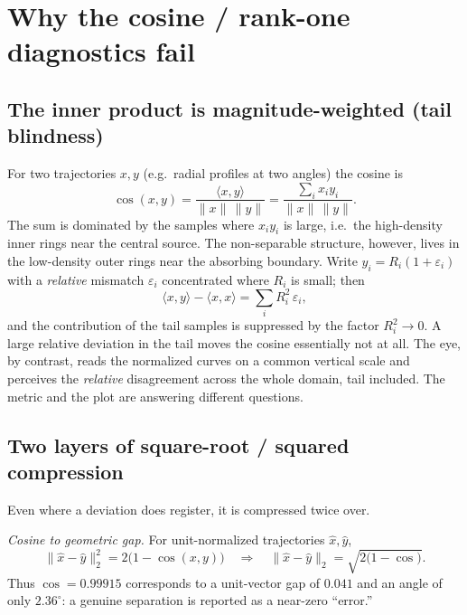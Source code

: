 \documentclass{article}
\begin{document}
\section{Why the cosine / rank-one diagnostics fail}

\subsection{The inner product is magnitude-weighted (tail blindness)}

For two trajectories $x,y$ (e.g.\ radial profiles at two angles) the cosine is
\begin{equation}
\cos(x,y)=\frac{\langle x,y\rangle}{\|x\|\,\|y\|}
=\frac{\sum_{i}x_{i}y_{i}}{\|x\|\,\|y\|}.
\end{equation}
The sum is dominated by the samples where $x_{i}y_{i}$ is large, i.e.\ the
high-density inner rings near the central source. The non-separable structure,
however, lives in the low-density outer rings near the absorbing boundary.
Write $y_{i}=R_{i}(1+\varepsilon_{i})$ with a \emph{relative} mismatch
$\varepsilon_{i}$ concentrated where $R_{i}$ is small; then
\begin{equation}
\langle x,y\rangle - \langle x,x\rangle
=\sum_{i}R_{i}^{2}\,\varepsilon_{i},
\end{equation}
and the contribution of the tail samples is suppressed by the factor
$R_{i}^{2}\to0$. A large relative deviation in the tail moves the cosine
essentially not at all. The eye, by contrast, reads the normalized curves on a
common vertical scale and perceives the \emph{relative} disagreement across the
whole domain, tail included. The metric and the plot are answering different
questions.

\subsection{Two layers of square-root / squared compression}

Even where a deviation does register, it is compressed twice over.

\emph{Cosine to geometric gap.} For unit-normalized trajectories
$\widehat x,\widehat y$,
\begin{equation}
\|\widehat x-\widehat y\|_{2}^{2}=2\bigl(1-\cos(x,y)\bigr)
\quad\Longrightarrow\quad
\|\widehat x-\widehat y\|_{2}=\sqrt{2\bigl(1-\cos\bigr)}.
\end{equation}
Thus $\cos=0.99915$ corresponds to a unit-vector gap of $0.041$ and an angle of
only $2.36^{\circ}$: a genuine separation is reported as a near-zero
``error.''
\end{document}
